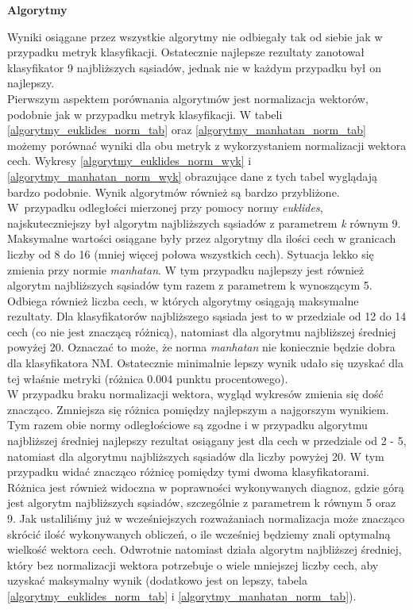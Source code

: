\documentclass[12pt]{article}
\begin{document}
\centerline{\textbf{Algorytmy }}

\indent Wyniki osiągane przez wszystkie algorytmy nie odbiegały tak od siebie jak w przypadku metryk klasyfikacji. Ostatecznie najlepsze rezultaty zanotował klasyfikator 9 najbliższych sąsiadów, jednak nie w każdym przypadku był on najlepszy. \\
\indent Pierwszym aspektem porównania algorytmów jest normalizacja wektorów, podobnie jak w przypadku metryk klasyfikacji. W tabeli \ref{algorytmy_euklides_norm_tab} oraz \ref{algorytmy_manhatan_norm_tab} możemy porównać wyniki dla obu metryk z wykorzystaniem normalizacji wektora cech. 
Wykresy \ref{algorytmy_euklides_norm_wyk} i \ref{algorytmy_manhatan_norm_wyk} obrazujące dane z tych tabel wyglądają bardzo podobnie. Wynik algorytmów również są bardzo przybliżone. W~przypadku odległości mierzonej przy pomocy  normy \textit{euklides}, najskuteczniejszy był algorytm najbliższych sąsiadów z parametrem \textit{k} równym 9. Maksymalne wartości osiągane były przez algorytmy dla ilości cech w granicach liczby od 8 do 16 (mniej więcej połowa wszystkich cech). Sytuacja lekko się zmienia przy normie \textit{manhatan}. W tym przypadku  najlepszy jest również algorytm najbliższych sąsiadów tym razem z parametrem k wynoszącym 5. Odbiega również liczba cech, w których algorytmy osiągają maksymalne rezultaty. Dla klasyfikatorów najbliższego sąsiada jest to w przedziale od 12 do 14 cech (co nie jest znaczącą różnicą), natomiast dla algorytmu najbliższej średniej powyżej 20. Oznaczać to może, że norma \textit{manhatan} nie koniecznie będzie dobra dla klasyfikatora NM. Ostatecznie minimalnie lepszy wynik udało się uzyskać dla tej właśnie metryki (różnica 0.004 punktu procentowego).\\
\indent W przypadku braku normalizacji wektora, wygląd wykresów zmienia się dość znacząco. Zmniejsza się różnica pomiędzy najlepszym a najgorszym wynikiem. Tym razem obie normy odległościowe są zgodne i w przypadku algorytmu najbliższej średniej najlepszy rezultat osiągany jest dla cech w przedziale od 2 - 5, natomiast dla algorytmu najbliższych sąsiadów dla liczby powyżej 20. W tym przypadku widać znacząco różnicę pomiędzy tymi dwoma klasyfikatorami. Różnica jest również widoczna w poprawności wykonywanych diagnoz, gdzie górą jest algorytm najbliższych sąsiadów, szczególnie z parametrem k równym 5 oraz 9. Jak ustaliliśmy już w wcześniejszych rozważaniach normalizacja może znacząco skrócić ilość wykonywanych obliczeń, o ile wcześniej będziemy znali optymalną wielkość wektora cech. Odwrotnie natomiast działa algorytm najbliższej średniej, który bez normalizacji wektora potrzebuje o wiele mniejszej liczby cech, aby uzyskać maksymalny wynik (dodatkowo jest on lepszy, tabela \ref{algorytmy_euklides_norm_tab} i \ref{algorytmy_manhatan_norm_tab}). \\
\end{document}
